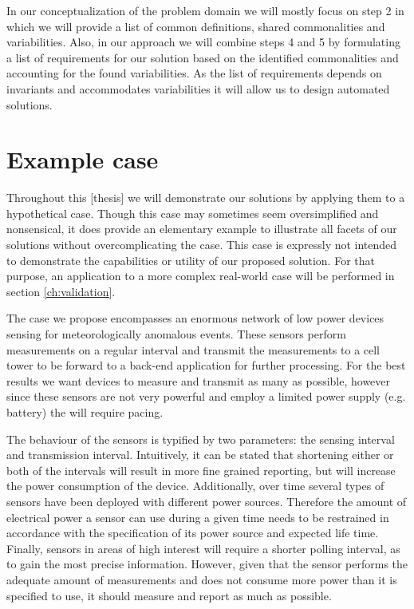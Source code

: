 In our conceptualization of the problem domain we will mostly focus on step 2 in which we will provide a list of common definitions, shared commonalities and variabilities. Also, in our approach we will combine steps 4 and 5 by formulating a list of requirements for our solution based on the identified commonalities and accounting for the found variabilities. As the list of requirements depends on invariants and accommodates variabilities it will allow us to design automated solutions.

\section{Example case}
\label{sec:example_case}
Throughout this [thesis] we will demonstrate our solutions by applying them to a hypothetical case. Though this case may sometimes seem oversimplified and nonsensical, it does provide an elementary example to illustrate all facets of our solutions without overcomplicating the case. This case is expressly not intended to demonstrate the capabilities or utility of our proposed solution. For that purpose, an application to a more complex real-world case will be performed in section \ref{ch:validation}. 

The case we propose encompasses an enormous network of low power devices sensing for meteorologically anomalous events. These sensors perform measurements on a regular interval and transmit the measurements to a cell tower to be forward to a back-end application for further processing. For the best results we want devices to measure and transmit as many as possible, however since these sensors are not very powerful and employ a limited power supply (e.g. battery) the will require pacing.

The behaviour of the sensors is typified by two parameters: the sensing interval and transmission interval. Intuitively, it can be stated that shortening either or both of the intervals will result in more fine grained reporting, but will increase the power consumption of the device. Additionally, over time several types of sensors have been deployed with different power sources. Therefore the amount of electrical power a sensor can use during a given time needs to be restrained in accordance with the specification of its power source and expected life time. Finally, sensors in areas of high interest will require a shorter polling interval, as to gain the most precise information. However, given that the sensor performs the adequate amount of measurements and does not consume more power than it is specified to use, it should measure and report as much as possible.

